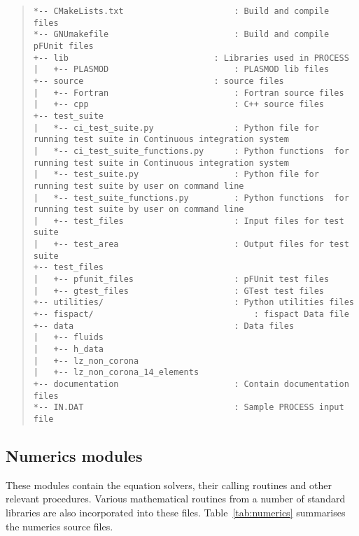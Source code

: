 \documentclass[11pt,a4paper]{report}
\begin{document}
\begin{quote}
	\begin{verbatim}
*-- CMakeLists.txt                      : Build and compile files
*-- GNUmakefile                         : Build and compile pFUnit files
+-- lib                             : Libraries used in PROCESS
|   +-- PLASMOD                         : PLASMOD lib files
+-- source                          : source files
|   +-- Fortran                         : Fortran source files
|   +-- cpp                             : C++ source files
+-- test_suite
|   *-- ci_test_suite.py                : Python file for running test suite in Continuous integration system
|   *-- ci_test_suite_functions.py      : Python functions  for running test suite in Continuous integration system
|   *-- test_suite.py                   : Python file for running test suite by user on command line
|   *-- test_suite_functions.py         : Python functions  for running test suite by user on command line
|   +-- test_files                      : Input files for test suite
|   +-- test_area                       : Output files for test suite
+-- test_files
|   +-- pfunit_files                    : pFUnit test files
|   +-- gtest_files                     : GTest test files
+-- utilities/                          : Python utilities files
+-- fispact/                                : fispact Data file
+-- data                                : Data files
|   +-- fluids
|   +-- h_data
|   +-- lz_non_corona
|   +-- lz_non_corona_14_elements
+-- documentation                       : Contain documentation files
*-- IN.DAT                              : Sample PROCESS input file	
	\end{verbatim}
\end{quote}

\subsection{Numerics modules}
\label{sec:numerics_modules}

These modules contain the equation solvers, their calling routines and other
relevant procedures. Various mathematical routines from a number of standard
libraries are also incorporated into these files. Table~\ref{tab:numerics}
summarises the numerics source files.
\end{document}
